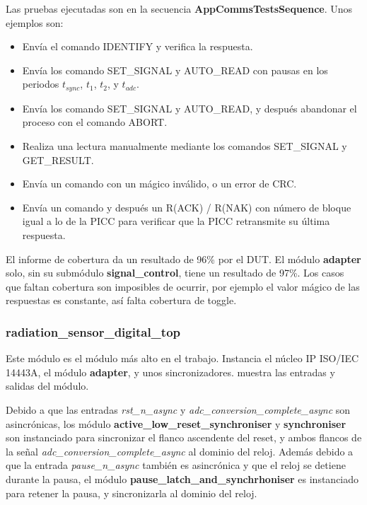 \documentclass[a4paper, twoside, 11pt]{report}
\begin{document}
Las pruebas ejecutadas son en la secuencia \textbf{AppCommsTestsSequence}. Unos ejemplos son:

\begin{itemize}
  \item Envía el comando IDENTIFY y verifica la respuesta.
  \item Envía los comando SET\_SIGNAL y AUTO\_READ con pausas en los periodos $t_{sync}$, $t_1$, $t_2$, y $t_{adc}$.
  \item Envía los comando SET\_SIGNAL y AUTO\_READ, y después abandonar el proceso con el comando ABORT.
  \item Realiza una lectura manualmente mediante los comandos SET\_SIGNAL y GET\_\-RESULT.
  \item Envía un comando con un mágico inválido, o un error de CRC.
  \item Envía un comando y después un R(ACK) / R(NAK) con número de bloque igual a lo de la PICC para verificar que la PICC retransmite su última respuesta.
\end{itemize}

El informe de cobertura da un resultado de 96\% por el DUT. El módulo \textbf{adapter} solo, sin su submódulo \textbf{signal\_control}, tiene un resultado de 97\%. Los casos que faltan cobertura son imposibles de ocurrir, por ejemplo el valor mágico de las respuestas es constante, así falta cobertura de toggle.

\FloatBarrier
\subsubsection{radiation\_sensor\_digital\_top}

Este módulo es el módulo más alto en el trabajo. Instancia el núcleo IP ISO/IEC 14443A, el módulo \textbf{adapter}, y unos sincronizadores.  muestra las entradas y salidas del módulo.

Debido a que las entradas \textit{rst\_n\_async} y \textit{adc\_conversion\_complete\_async} son asincrónicas, los módulo \textbf{active\_low\_reset\_synchroniser} y \textbf{synchroniser} son instanciado para sincronizar el flanco ascendente del reset, y ambos flancos de la señal \textit{adc\_conversion\_\-complete\_async} al dominio del reloj. Además debido a que la entrada \textit{pause\_n\_async} también es asincrónica y que el reloj se detiene durante la pausa, el módulo \textbf{pause\_latch\_and\_synchrhoniser} es instanciado para retener la pausa, y sincronizarla al dominio del reloj.
\end{document}
